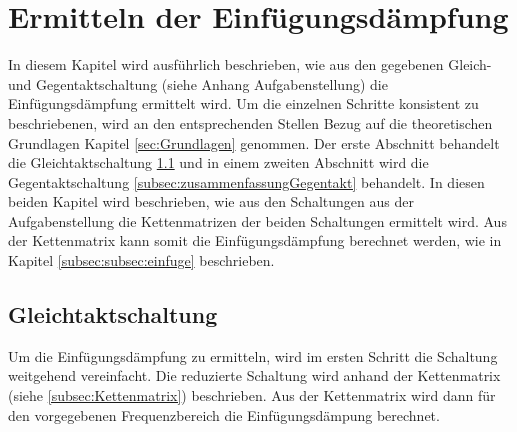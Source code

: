 \section{Ermitteln der Einfügungsdämpfung} \label{sec:umsetzung}
In diesem Kapitel wird ausführlich beschrieben, wie aus den gegebenen Gleich- und Gegentaktschaltung (siehe Anhang Aufgabenstellung) die Einfügungsdämpfung ermittelt wird. Um die einzelnen Schritte konsistent zu beschriebenen, wird an den entsprechenden Stellen Bezug auf die theoretischen Grundlagen Kapitel \ref{sec:Grundlagen} genommen. Der erste Abschnitt behandelt die Gleichtaktschaltung \ref{subsec:zusammenfassungGleichtakt} und in einem zweiten Abschnitt wird die Gegentaktschaltung \ref{subsec:zusammenfassungGegentakt} behandelt. In diesen beiden Kapitel wird beschrieben, wie aus den Schaltungen aus der Aufgabenstellung die Kettenmatrizen der beiden Schaltungen ermittelt wird. Aus der Kettenmatrix kann somit die Einfügungsdämpfung berechnet werden, wie in Kapitel \ref{subsec:subsec:einfuge} beschrieben.


\subsection{Gleichtaktschaltung}\label{subsec:zusammenfassungGleichtakt}
Um die Einfügungsdämpfung zu ermitteln, wird im ersten Schritt die Schaltung weitgehend vereinfacht. Die reduzierte Schaltung wird anhand der Kettenmatrix (siehe \ref{subsec:Kettenmatrix}) beschrieben. Aus der Kettenmatrix wird dann für den vorgegebenen Frequenzbereich die Einfügungsdämpung berechnet.

